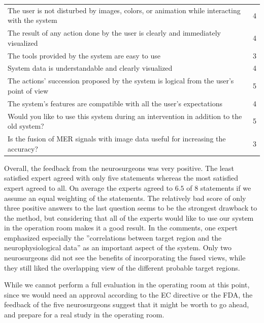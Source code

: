 \documentclass{egpubl}
\begin{document}
\noindent \begin{tabular}{p{} c}
\hline
The user is not disturbed by images, colors, or animation while interacting with the system	& 4\\
The result of any action done by the user is clearly and immediately visualized				& 4\\
The tools provided by the system are easy to use												& 3\\
System data is understandable and clearly visualized											& 4\\
The actions' succession proposed by the system is logical from the user's point of view		& 5\\
The system's features are compatible with all the user's expectations							& 4\\
Would you like to use this system during an intervention in addition to the old system?		& 5\\
Is the fusion of MER signals with image data useful for increasing the accuracy?				& 3\\
\hline
\end{tabular}


Overall, the feedback from the neurosurgeons was very positive. The least satisfied expert agreed with only five statements whereas the most satisfied expert agreed to all. On average the experts agreed to $6.5$ of $8$ statements if we assume an equal weighting of the statements. The relatively bad score of only three positive answers to the last question seems to be the strongest drawback to the method, but considering that all of the experts would like to use our system in the operation room makes it a good result. In the comments, one expert emphasized especially the ''correlations between target region and the neurophysiological data'' as an important aspect of the system. Only two neurosurgeons did not see the benefits of incorporating the fused views, while they still liked the overlapping view of the different probable target regions.

While we cannot perform a full evaluation in the operating room at this point, since we would need an approval according to the EC directive or the FDA, the feedback of the five neurosurgeons suggest that it might be worth to go ahead, and prepare for a real study in the operating room.
\end{document}
